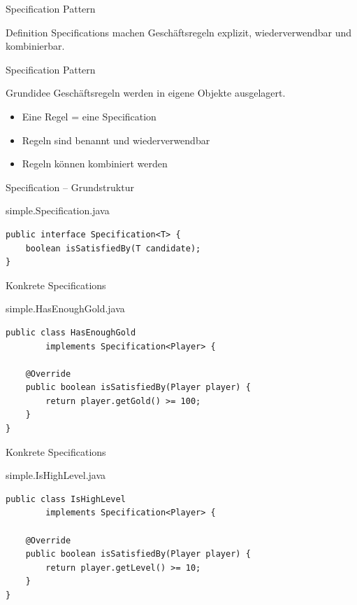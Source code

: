 \begin{frame}{Specification Pattern}
	\begin{block}{Definition}
		Specifications machen Geschäftsregeln explizit, 
		wiederverwendbar und kombinierbar.
	\end{block}
\end{frame}


\begin{frame}{Specification Pattern}
	\begin{block}{Grundidee}
		Geschäftsregeln werden in eigene Objekte ausgelagert.
	\end{block}
	\pause
	\begin{itemize}
	  \item Eine Regel = eine Specification
	  \item Regeln sind benannt und wiederverwendbar
	  \item Regeln können kombiniert werden
	\end{itemize}
\end{frame}

\begin{frame}[fragile]{Specification – Grundstruktur}
	\begin{exampleblock}{simple.Specification.java}
		\begin{lstlisting}
public interface Specification<T> {
    boolean isSatisfiedBy(T candidate);
}
		\end{lstlisting}
	\end{exampleblock}
\end{frame}

\begin{frame}[fragile]{Konkrete Specifications}
	\begin{exampleblock}{simple.HasEnoughGold.java}
		\begin{lstlisting}
public class HasEnoughGold
        implements Specification<Player> {

    @Override
    public boolean isSatisfiedBy(Player player) {
        return player.getGold() >= 100;
    }
}
		\end{lstlisting}
	\end{exampleblock}
\end{frame}

\begin{frame}[fragile]{Konkrete Specifications}
	\begin{exampleblock}{simple.IsHighLevel.java}
		\begin{lstlisting}
public class IsHighLevel
        implements Specification<Player> {

    @Override
    public boolean isSatisfiedBy(Player player) {
        return player.getLevel() >= 10;
    }
}
		\end{lstlisting}
	\end{exampleblock}
\end{frame}

